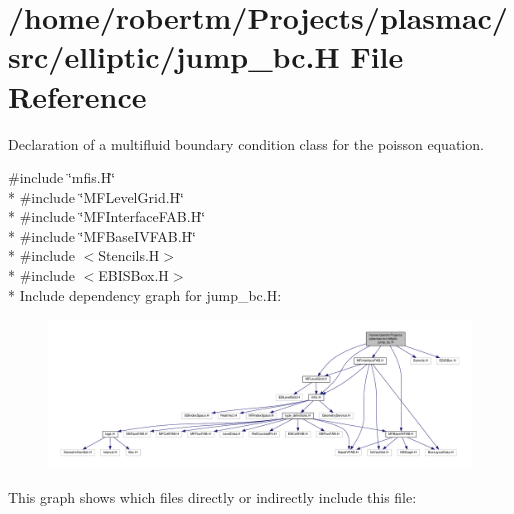 \hypertarget{jump__bc_8H}{}\section{/home/robertm/\+Projects/plasmac/src/elliptic/jump\+\_\+bc.H File Reference}
\label{jump__bc_8H}


Declaration of a multifluid boundary condition class for the poisson equation.  


{\ttfamily \#include \char`\"{}mfis.\+H\char`\"{}}\\*
{\ttfamily \#include \char`\"{}M\+F\+Level\+Grid.\+H\char`\"{}}\\*
{\ttfamily \#include \char`\"{}M\+F\+Interface\+F\+A\+B.\+H\char`\"{}}\\*
{\ttfamily \#include \char`\"{}M\+F\+Base\+I\+V\+F\+A\+B.\+H\char`\"{}}\\*
{\ttfamily \#include $<$Stencils.\+H$>$}\\*
{\ttfamily \#include $<$E\+B\+I\+S\+Box.\+H$>$}\\*
Include dependency graph for jump\+\_\+bc.\+H\+:\nopagebreak
\begin{figure}[H]
\begin{center}
\leavevmode
\includegraphics[width=350pt]{jump__bc_8H__incl}
\end{center}
\end{figure}
This graph shows which files directly or indirectly include this file\+:\nopagebreak
